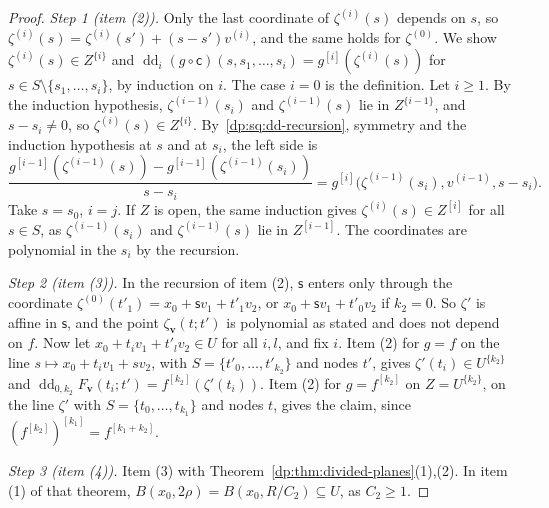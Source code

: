 \documentclass[11pt]{amsart}
\theoremstyle{definition}
\theoremstyle{remark}
\numberwithin{equation}{section}
\theoremstyle{plain}
\theoremstyle{definition}
\theoremstyle{plain}
\begin{document}
\begin{proof}
\emph{Step 1 (item (2)).} Only the last coordinate of $\zeta^{(i)}(s)$ depends on $s$, so $\zeta^{(i)}(s)=\zeta^{(i)}(s')+(s-s')v^{(i)}$, and the same holds for $\zeta^{(0)}$. We show $\zeta^{(i)}(s)\in Z^{\{i\}}$ and $\operatorname{dd}_i(g\circ\mathsf c)(s,s_1,\dots,s_i)=g^{[i]}(\zeta^{(i)}(s))$ for $s\in S\setminus\{s_1,\dots,s_i\}$, by induction on $i$. The case $i=0$ is the definition. Let $i\ge1$. By the induction hypothesis, $\zeta^{(i-1)}(s_i)$ and $\zeta^{(i-1)}(s)$ lie in $Z^{\{i-1\}}$, and $s-s_i\ne0$, so $\zeta^{(i)}(s)\in Z^{\{i\}}$. By~\eqref{dp:sq:dd-recursion}, symmetry and the induction hypothesis at $s$ and at $s_i$, the left side is
\[
 \frac{g^{[i-1]}(\zeta^{(i-1)}(s))-g^{[i-1]}(\zeta^{(i-1)}(s_i))}{s-s_i}=g^{[i]}\bigl(\zeta^{(i-1)}(s_i),v^{(i-1)},s-s_i\bigr).
\]
Take $s=s_0$, $i=j$. If $Z$ is open, the same induction gives $\zeta^{(i)}(s)\in Z^{[i]}$ for all $s\in S$, as $\zeta^{(i-1)}(s_i)$ and $\zeta^{(i-1)}(s)$ lie in $Z^{[i-1]}$. The coordinates are polynomial in the $s_i$ by the recursion.

\emph{Step 2 (item (3)).} In the recursion of item (2), $\mathsf s$ enters only through the coordinate $\zeta^{(0)}(t'_1)=x_0+\mathsf sv_1+t'_1v_2$, or $x_0+\mathsf sv_1+t'_0v_2$ if $k_2=0$. So $\zeta'$ is affine in $\mathsf s$, and the point $\zeta_{\mathbf v}(t;t')$ is polynomial as stated and does not depend on $f$. Now let $x_0+t_iv_1+t'_lv_2\in U$ for all $i,l$, and fix $i$. Item (2) for $g=f$ on the line $s\mapsto x_0+t_iv_1+sv_2$, with $S=\{t'_0,\dots,t'_{k_2}\}$ and nodes $t'$, gives $\zeta'(t_i)\in U^{\{k_2\}}$ and $\operatorname{dd}_{0,k_2}F_{\mathbf v}(t_i;t')=f^{[k_2]}(\zeta'(t_i))$. Item (2) for $g=f^{[k_2]}$ on $Z=U^{\{k_2\}}$, on the line $\zeta'$ with $S=\{t_0,\dots,t_{k_1}\}$ and nodes $t$, gives the claim, since $(f^{[k_2]})^{[k_1]}=f^{[k_1+k_2]}$.

\emph{Step 3 (item (4)).} Item (3) with Theorem~\ref{dp:thm:divided-planes}(1),(2). In item (1) of that theorem, $B(x_0,2\rho)=B(x_0,R/C_2)\subseteq U$, as $C_2\ge1$.


\end{proof}
\end{document}
